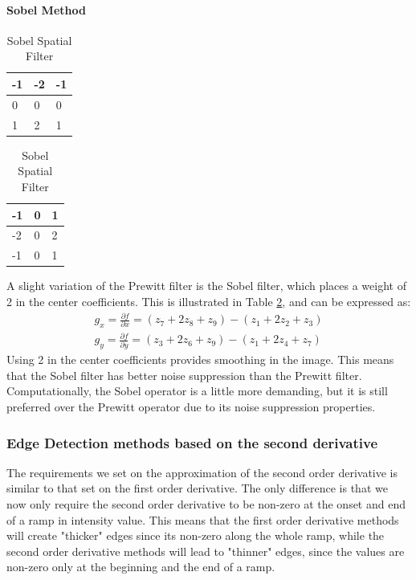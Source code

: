 \paragraph{Sobel Method}
\begin{table}[h]
\centering
\caption{Sobel Spatial Filter}
\begin{tabular}{|l|l|l|}
\hline
-1 & -2 & -1 \\ \hline
0  & 0 & 0 \\ \hline
1 & 2 & 1 \\\hline
\end{tabular}
\quad
\begin{tabular}{|l|l|l|}
\hline
-1 & 0 & 1 \\ \hline
-2 & 0 & 2 \\ \hline
-1 & 0 & 1 \\ \hline
\end{tabular}
\label{sobel}
\end{table}
A slight variation of the Prewitt filter is the Sobel filter, which places a weight of 2 in the center coefficients. This is illustrated in Table \ref{sobel}, and can be expressed as:
\begin{align*}
g_x = \frac{\partial f}{\partial x} = (z_7+2z_8+z_9)-(z_1+2z_2+z_3)\\
g_y = \frac{\partial f}{\partial y} = (z_3 + 2z_6+z_9) - (z_1+2z_4+z_7)
\end{align*}
Using 2 in the center coefficients provides smoothing in the image. This means that the Sobel filter has better noise suppression than the Prewitt filter. Computationally, the Sobel operator is a little more demanding, but it is still preferred over the Prewitt operator due to its noise suppression properties.

\subsubsection{Edge Detection methods based on the second derivative}
The requirements we set on the approximation of the second order derivative is similar to that set on the first order derivative. The only difference is that we now only require the second order derivative to be non-zero at the onset and end of a ramp in intensity value. This means that the first order derivative methods will create "thicker" edges since its non-zero along the whole ramp, while the second order derivative methods will lead to "thinner" edges, since the values are non-zero only at the beginning and the end of a ramp.

